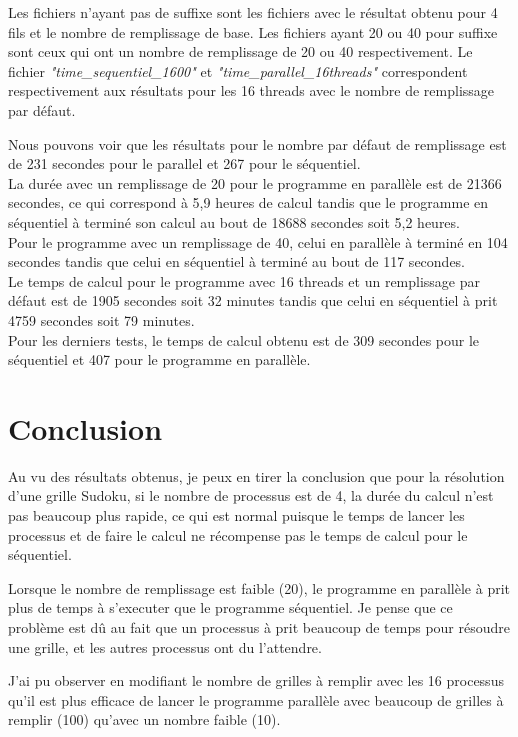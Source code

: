 \documentclass[12pt]{article}
\begin{document}
Les fichiers n'ayant pas de suffixe sont les fichiers avec le résultat obtenu pour 4 fils et le nombre de remplissage de base. Les fichiers ayant 20 ou 40 pour suffixe sont ceux qui ont un nombre de remplissage de 20 ou 40 respectivement. Le fichier \textit{"time\_sequentiel\_1600"} et \textit{"time\_parallel\_16threads"} correspondent respectivement aux résultats pour les 16 threads avec le nombre de remplissage par défaut.

Nous pouvons voir que les résultats pour le nombre par défaut de remplissage est de 231 secondes pour le parallel et 267 pour le séquentiel. \\
La durée avec un remplissage de 20 pour le programme en parallèle est de 21366 secondes, ce qui correspond à 5,9 heures de calcul tandis que le programme en séquentiel à terminé son calcul au bout de 18688 secondes soit 5,2 heures. \\
Pour le programme avec un remplissage de 40, celui en parallèle à terminé en 104 secondes tandis que celui en séquentiel à terminé au bout de 117 secondes.\\
Le temps de calcul pour le programme avec 16 threads et un remplissage par défaut est de 1905 secondes soit 32 minutes tandis que celui en séquentiel à prit 4759 secondes soit 79 minutes.\\
Pour les derniers tests, le temps de calcul obtenu est de 309 secondes pour le séquentiel et 407 pour le programme en parallèle.

\section{Conclusion}
Au vu des résultats obtenus, je peux en tirer la conclusion que pour la résolution d'une grille Sudoku, si le nombre de processus est de 4, la durée du calcul n'est pas beaucoup plus rapide, ce qui est normal puisque le temps de lancer les processus et de faire le calcul ne récompense pas le temps de calcul pour le séquentiel. 

Lorsque le nombre de remplissage est faible (20), le programme en parallèle à prit plus de temps à s'executer que le programme séquentiel. Je pense que ce problème est dû au fait que un processus à prit beaucoup de temps pour résoudre une grille, et les autres processus ont du l'attendre.

J'ai pu observer en modifiant le nombre de grilles à remplir avec les 16 processus qu'il est plus efficace de lancer le programme parallèle avec beaucoup de grilles à remplir (100) qu'avec un nombre faible (10).
\end{document}
